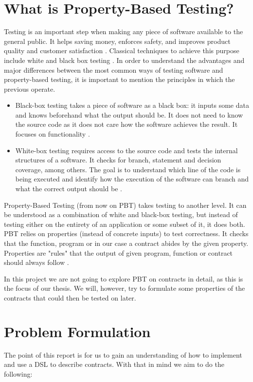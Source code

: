 \documentclass{ituthesis}
\begin{document}
\section{What is Property-Based Testing?}
Testing is an important step when making any piece of software available to the general public. It helps saving money, enforces safety, and improves product quality and customer satisfaction \cite{4reasonstesting}.
Classical techniques to achieve this purpose include white and black box testing \cite{testing}.
In order to understand the advantages and major differences between the most common ways of testing software and property-based testing, it is important to mention the principles in which the previous operate.
\begin{itemize}
    \item Black-box testing takes a piece of software as a black box: it inputs some data and knows beforehand what the output should be. It does not need to know the source code as it does not care how the software achieves the result. It focuses on functionality \cite{testing}.
    \item White-box testing requires access to the source code and tests the internal structures of a software. It checks for branch, statement and decision coverage, among others. The goal is to understand which line of the code is being executed and identify how the execution of the software can branch and what the correct output should be \cite{williams2006white}.
\end{itemize}

Property-Based Testing (from now on PBT) takes testing to another level. It can be understood as a combination of white and black-box testing, but instead of testing either on the entirety of an application or some subset of it, it does both. PBT relies on properties (instead of concrete inputs) to test correctness. It checks that the function, program or in our case a contract abides by the given property. Properties are "rules" that the output of given program, function or contract should always follow \cite{fink1994towards}.

In this project we are not going to explore PBT on contracts in detail, as this is the focus of our thesis. We will, however, try to formulate some properties of the contracts that could then be tested on later.

\section{Problem Formulation}
The point of this report is for us to gain an understanding of how to implement and use a DSL to describe contracts. With that in mind we aim to do the following:
\end{document}
